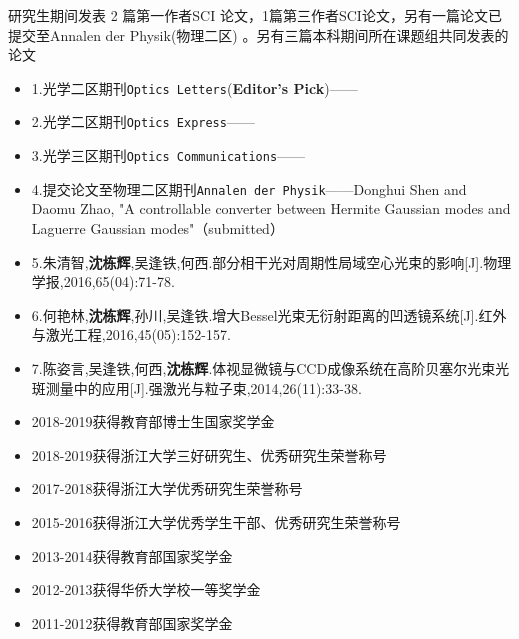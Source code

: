 \documentclass[zh]{resume}
\begin{document}
研究生期间发表 2 篇第一作者SCI 论文，1篇第三作者SCI论文，另有一篇论文已提交至Annalen der Physik(物理二区)
。另有三篇本科期间所在课题组共同发表的论文
\begin{itemize}
  \item 1.光学二区期刊\texttt{Optics Letters}(\textbf{Editor's Pick})——
  \item 2.光学二区期刊\texttt{Optics Express}——
  \item 3.光学三区期刊\texttt{Optics Communications}——
  \item 4.提交论文至物理二区期刊\texttt{Annalen der Physik}——{Donghui Shen and Daomu Zhao, "A controllable converter between Hermite Gaussian modes and Laguerre Gaussian modes"（submitted）}
  \item 5.朱清智,\textbf{沈栋辉},吴逢铁,何西.部分相干光对周期性局域空心光束的影响[J].物理学报,2016,65(04):71-78.
  \item 6.何艳林,\textbf{沈栋辉},孙川,吴逢铁.增大Bessel光束无衍射距离的凹透镜系统[J].红外与激光工程,2016,45(05):152-157.
  \item 7.陈姿言,吴逢铁,何西,\textbf{沈栋辉}.体视显微镜与CCD成像系统在高阶贝塞尔光束光斑测量中的应用[J].强激光与粒子束,2014,26(11):33-38.
\end{itemize}

\begin{itemize}
  \item 2018-2019获得教育部博士生国家奖学金
  \item 2018-2019获得浙江大学三好研究生、优秀研究生荣誉称号
  \item 2017-2018获得浙江大学优秀研究生荣誉称号
  \item 2015-2016获得浙江大学优秀学生干部、优秀研究生荣誉称号
  \item 2013-2014获得教育部国家奖学金
  \item 2012-2013获得华侨大学校一等奖学金
  \item 2011-2012获得教育部国家奖学金
  
\end{itemize}
\end{document}
